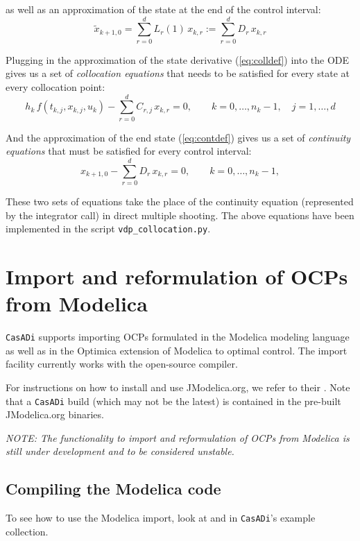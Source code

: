 \documentclass[a4paper,12pt]{book}
\newcommand{\CasADi}{\texttt{CasADi}\xspace}
\begin{document}
as well as an approximation of the state at the end of the control interval:
\begin{equation}
\tilde{x}_{k+1,0} = \sum_{r=0}^{d}{L_r(1) \, x_{k,r}} := \sum_{r=0}^{d}{D_r \, x_{k,r}}
\label{eq:contdef}
\end{equation}

Plugging in the approximation of the state derivative (\ref{eq:colldef}) into the ODE gives us a set of \emph{collocation equations} that needs to be satisfied for every state at every collocation point:
\begin{equation}
h_k \, f(t_{k,j},x_{k,j},u_k) - \sum_{r=0}^{d}{C_{r,j} \, x_{k,r}} = 0, \qquad k=0,\ldots,n_k-1, \quad j=1,\ldots,d
\end{equation}

And the approximation of the end state (\ref{eq:contdef}) gives us a set of \emph{continuity equations} that must be satisfied for every control interval:
\begin{equation}
x_{k+1,0} - \sum_{r=0}^{d}{D_r \, x_{k,r}} = 0, \qquad k=0,\ldots,n_k-1, 
\end{equation}

These two sets of equations take the place of the continuity equation (represented by the integrator call) in direct multiple shooting. The above equations have been implemented in the script \texttt{vdp\_collocation.py}.

\chapter{Import and reformulation of OCPs from Modelica} \label{ch:modelica}
\CasADi supports importing OCPs formulated in the Modelica modeling language as well as in the Optimica extension of Modelica to optimal control. The import facility currently works with the open-source  compiler.

For instructions on how to install and use JModelica.org, we refer to their . Note that a \CasADi build (which may not be the latest) is contained in the pre-built JModelica.org binaries.

\emph{NOTE: The functionality to import and reformulation of OCPs from Modelica is still under development and to be considered unstable.}

\section{Compiling the Modelica code} \label{sec:modelica_compilation}
To see how to use the Modelica import, look at  and  in \CasADi's example collection. 
\end{document}
